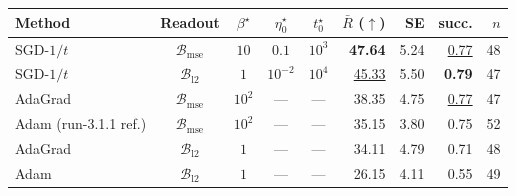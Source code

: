 \begin{tabular}{@{}>{\raggedright\arraybackslash}p{2.5cm} c c c c r r r r@{}}
\toprule
\textbf{Method} & \textbf{Readout} & \textbf{$\beta^\star$} & \textbf{$\eta_0^\star$} & \textbf{$t_0^\star$} & \textbf{$\bar{R}$ ($\uparrow$)} & \textbf{SE} & \textbf{succ.} & \textbf{$n$} \\
\midrule
SGD-$1/t$ & $\mathcal{B}_{\mathrm{mse}}$ & $10$ & $0.1$ & $10^{3}$ & \textbf{47.64} & 5.24 & \underline{0.77} & 48 \\
SGD-$1/t$ & $\mathcal{B}_{\mathrm{l2}}$ & $1$ & $10^{-2}$ & $10^{4}$ & \underline{45.33} & 5.50 & \textbf{0.79} & 47 \\
AdaGrad & $\mathcal{B}_{\mathrm{mse}}$ & $10^{2}$ & --- & --- & 38.35 & 4.75 & \underline{0.77} & 47 \\
Adam (run-3.1.1 ref.) & $\mathcal{B}_{\mathrm{mse}}$ & $10^{2}$ & --- & --- & 35.15 & 3.80 & 0.75 & 52 \\
AdaGrad & $\mathcal{B}_{\mathrm{l2}}$ & $1$ & --- & --- & 34.11 & 4.79 & 0.71 & 48 \\
Adam & $\mathcal{B}_{\mathrm{l2}}$ & $1$ & --- & --- & 26.15 & 4.11 & 0.55 & 49 \\
\bottomrule
\end{tabular}
